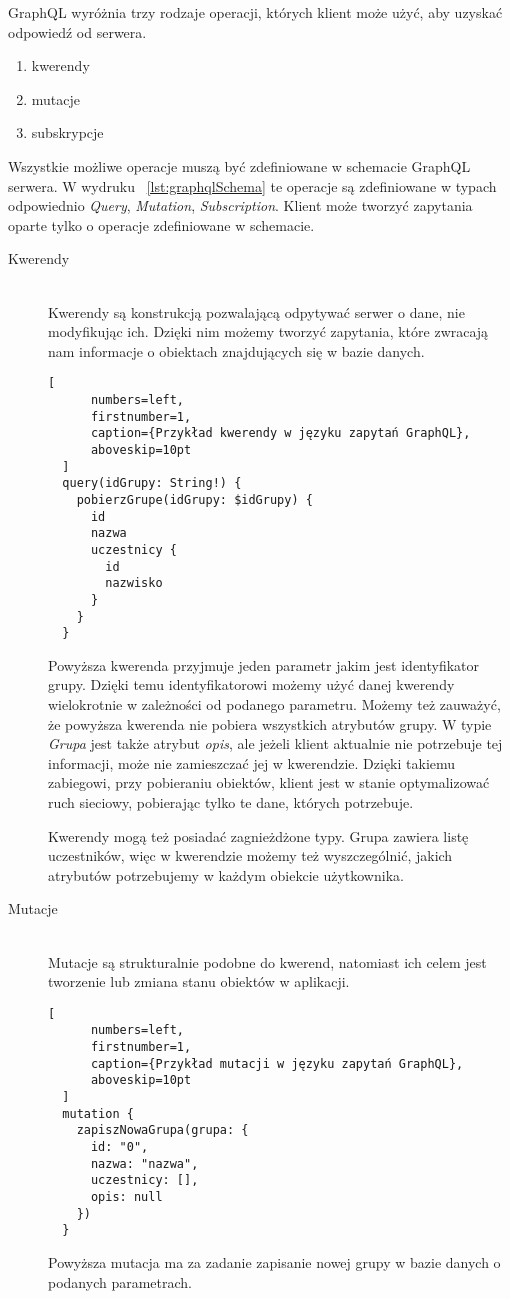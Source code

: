 GraphQL wyróżnia trzy rodzaje operacji, których klient może użyć, aby uzyskać odpowiedź od serwera.
\begin{enumerate}
  \item kwerendy
  \item mutacje
  \item subskrypcje
\end{enumerate}
Wszystkie możliwe operacje muszą być zdefiniowane w schemacie GraphQL serwera. W wydruku ~\ref{lst:graphqlSchema} te operacje są zdefiniowane w typach odpowiednio \emph{Query}, \emph{Mutation}, \emph{Subscription}. Klient może tworzyć zapytania oparte tylko o operacje zdefiniowane w schemacie.

\begin{description}
  \item[Kwerendy] \hfill \\ Kwerendy są konstrukcją pozwalającą odpytywać serwer o dane, nie modyfikując ich. Dzięki nim możemy tworzyć zapytania, które zwracają nam informacje o obiektach znajdujących się w bazie danych.
  \begin{addmargin}[6mm]{0mm}
  \begin{lstlisting}[
      numbers=left,
      firstnumber=1,
      caption={Przykład kwerendy w języku zapytań GraphQL},
      aboveskip=10pt
  ]
  query(idGrupy: String!) {
    pobierzGrupe(idGrupy: $idGrupy) {
      id
      nazwa
      uczestnicy {
        id
        nazwisko
      }
    }
  }
  \end{lstlisting}
  \end{addmargin}

  Powyższa kwerenda przyjmuje jeden parametr jakim jest identyfikator grupy. Dzięki temu identyfikatorowi możemy użyć danej kwerendy wielokrotnie w zależności od podanego parametru. Możemy też zauważyć, że powyższa kwerenda nie pobiera wszystkich atrybutów grupy. W typie \emph{Grupa} jest także atrybut \emph{opis}, ale jeżeli klient aktualnie nie potrzebuje tej informacji, może nie zamieszczać jej w kwerendzie. Dzięki takiemu zabiegowi, przy pobieraniu obiektów, klient jest w stanie optymalizować ruch sieciowy, pobierając tylko te dane, których potrzebuje.

  Kwerendy mogą też posiadać zagnieżdżone typy. Grupa zawiera listę uczestników, więc w kwerendzie możemy też wyszczególnić, jakich atrybutów potrzebujemy w każdym obiekcie użytkownika.
  \newline
  \item[Mutacje] \hfill \\ Mutacje są strukturalnie podobne do kwerend, natomiast ich celem jest tworzenie lub zmiana stanu obiektów w aplikacji.
  \begin{addmargin}[6mm]{0mm}
  \begin{lstlisting}[
      numbers=left,
      firstnumber=1,
      caption={Przykład mutacji w języku zapytań GraphQL},
      aboveskip=10pt
  ]
  mutation {
    zapiszNowaGrupa(grupa: {
      id: "0",
      nazwa: "nazwa",
      uczestnicy: [],
      opis: null
    })
  }
  \end{lstlisting}
  \end{addmargin}
  Powyższa mutacja ma za zadanie zapisanie nowej grupy w bazie danych o podanych parametrach.


\end{description}
